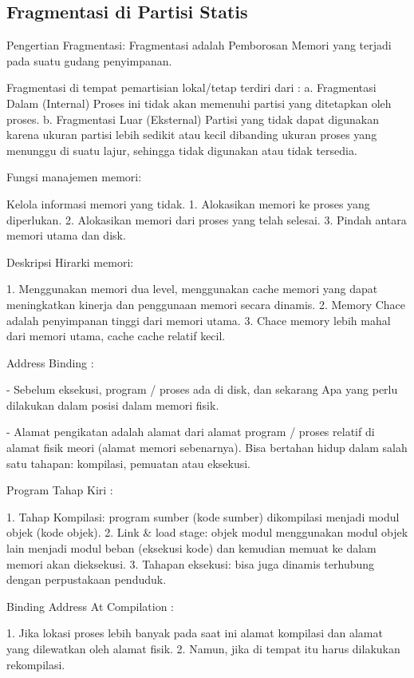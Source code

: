 \subsection {Fragmentasi di Partisi Statis}

Pengertian Fragmentasi:
Fragmentasi adalah Pemborosan Memori yang terjadi pada suatu gudang penyimpanan.

Fragmentasi di tempat pemartisian lokal/tetap terdiri dari :
a. Fragmentasi Dalam (Internal)
Proses ini tidak akan memenuhi partisi yang ditetapkan oleh proses.
b. Fragmentasi Luar (Eksternal)
Partisi yang tidak dapat digunakan karena ukuran partisi lebih sedikit atau kecil dibanding ukuran proses yang menunggu di suatu lajur, sehingga tidak digunakan atau tidak tersedia.

Fungsi manajemen memori:

Kelola informasi memori yang tidak.
1. Alokasikan memori ke proses yang diperlukan.
2. Alokasikan memori dari proses yang telah selesai.
3. Pindah antara memori utama dan disk.

Deskripsi Hirarki memori:

1. Menggunakan memori dua level, menggunakan cache memori yang dapat meningkatkan kinerja dan penggunaan memori secara dinamis.
2. Memory Chace adalah penyimpanan tinggi dari memori utama.
3. Chace memory lebih mahal dari memori utama, cache cache relatif kecil.


Address Binding :

- Sebelum eksekusi, program / proses ada di disk, dan sekarang Apa yang perlu dilakukan dalam posisi dalam memori fisik.

- Alamat pengikatan adalah alamat dari alamat program / proses relatif di alamat fisik meori (alamat memori sebenarnya). Bisa bertahan hidup dalam salah satu tahapan: kompilasi, pemuatan atau eksekusi.


Program Tahap Kiri :

1. Tahap Kompilasi: program sumber (kode sumber) dikompilasi menjadi modul objek (kode objek).
2. Link & load stage: objek modul menggunakan modul objek lain menjadi modul beban (eksekusi kode) dan kemudian memuat ke dalam memori akan dieksekusi.
3. Tahapan eksekusi: bisa juga dinamis terhubung dengan perpustakaan penduduk.

Binding Address At Compilation :

1. Jika lokasi proses lebih banyak pada saat ini alamat kompilasi dan alamat yang dilewatkan oleh alamat fisik.
2. Namun, jika di tempat itu harus dilakukan rekompilasi.

